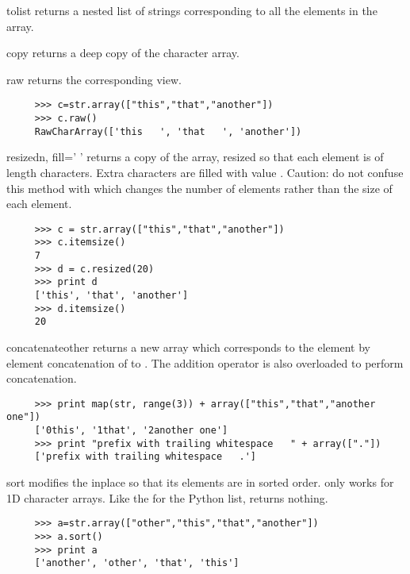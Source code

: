\begin{methoddesc}[RawCharArray]{tolist}{}
   returns a nested list of strings corresponding to all the
  elements in the array.
\end{methoddesc}
\begin{methoddesc}[RawCharArray]{copy}{}
   returns a deep copy of the character array.
\end{methoddesc}
\begin{methoddesc}[RawCharArray]{raw}{}
   returns the corresponding  view.
\begin{verbatim}
     >>> c=str.array(["this","that","another"])
     >>> c.raw()
     RawCharArray(['this   ', 'that   ', 'another'])
\end{verbatim}
\end{methoddesc}
\begin{methoddesc}{resized}{n, fill=' '}
   returns a copy of the array, resized so that each element
  is of length  characters.  Extra characters are filled with value
  .  Caution: do not confuse this method with  which
  changes the number of elements rather than the size of each element.
\begin{verbatim}
     >>> c = str.array(["this","that","another"])
     >>> c.itemsize()
     7
     >>> d = c.resized(20)
     >>> print d
     ['this', 'that', 'another']
     >>> d.itemsize()
     20
\end{verbatim}
\end{methoddesc}
\begin{methoddesc}[RawCharArray]{concatenate}{other}
   returns a new array which corresponds to the
  element by element concatenation of  to .  The
  addition operator is also overloaded to perform concatenation.
\begin{verbatim}
     >>> print map(str, range(3)) + array(["this","that","another one"])
     ['0this', '1that', '2another one']
     >>> print "prefix with trailing whitespace   " + array(["."])
     ['prefix with trailing whitespace   .']
\end{verbatim}
\end{methoddesc}
\begin{methoddesc}[RawCharArray]{sort}{}
   modifies the  inplace so that its elements are in
  sorted order.  only works for 1D character arrays.  Like the
   for the Python list,  returns nothing.
\begin{verbatim}
     >>> a=str.array(["other","this","that","another"])
     >>> a.sort()
     >>> print a
     ['another', 'other', 'that', 'this']
\end{verbatim}
\end{methoddesc}
